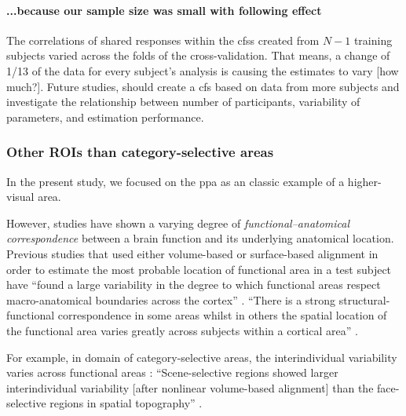\paragraph{...because our sample size was small with following effect}


The correlations of shared responses within the \acp{cfs} created from $N-1$
training subjects varied across the folds of the cross-validation.
That means, a change of 1/13 of the data for every subject's analysis is causing
the estimates to vary [how much?].
Future studies, should create a \ac{cfs} based on data from more subjects and
investigate the relationship between number of participants, variability of
parameters, and estimation performance.



\subsubsection{Other ROIs than category-selective areas}




%
In the present study, we focused on the \ac{ppa} as an classic example of a
higher-visual area.

%
However, studies have shown a varying degree of \textit{functional--anatomical
correspondence} between a brain function and its underlying anatomical location.
%
Previous studies that used either volume-based \citep{zhen2017quantifying,
zhen2015quantifying} or surface-based alignment \citep{rosenke2021probabilistic,
frost2012measuring} in order to estimate the most probable location of
functional area in a test subject have ``found a large variability in the degree
to which functional areas respect macro-anatomical boundaries across the
cortex'' \citep{frost2012measuring}.
%
``There is a strong structural-functional correspondence in some areas whilst in
others the spatial location of the functional area varies greatly across
subjects within a cortical area'' \citep{frost2012measuring}.

%
For example, in domain of category-selective areas, the interindividual
variability varies across functional areas \citep{zhen2017quantifying,
zhen2015quantifying, frost2012measuring}:
%
``Scene-selective regions showed larger interindividual variability [after
nonlinear volume-based alignment] than the face-selective regions in spatial
topography'' \citep{zhen2017quantifying}.




